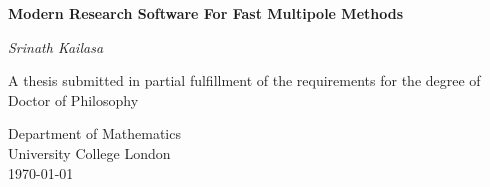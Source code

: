 \begin{titlepage}
    \begin{center}
        \vspace*{1cm}

        \Huge
        \textbf{Modern Research Software For Fast Multipole Methods}

        \Large
        \vspace{0.5cm}


        \textit{Srinath Kailasa}

        \vfill

        A thesis submitted in partial fulfillment of the requirements for the
        degree of Doctor of Philosophy

        \vspace{0.8cm}


        \large
        Department of Mathematics\\
        University College London\\
        \monthyeardate\today

    \end{center}
 \end{titlepage}

